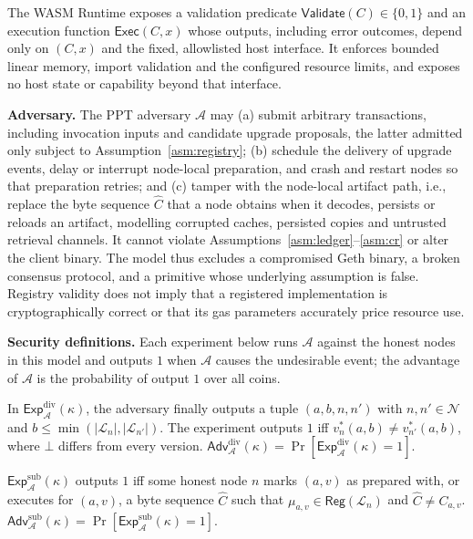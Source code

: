 \documentclass[runningheads]{llncs}
\begin{document}
\begin{assumption}
\label{asm:runtime}
The WASM Runtime exposes a validation predicate $\mathsf{Validate}(C)\in\{0,1\}$ and an execution function $\mathsf{Exec}(C,x)$ whose outputs, including error outcomes, depend only on $(C,x)$ and the fixed, allowlisted host interface. It enforces bounded linear memory, import validation and the configured resource limits, and exposes no host state or capability beyond that interface.
\end{assumption}

\noindent\textbf{Adversary.} The PPT adversary $\mathcal{A}$ may (a) submit arbitrary transactions, including invocation inputs and candidate upgrade proposals, the latter admitted only subject to Assumption~\ref{asm:registry}; (b) schedule the delivery of upgrade events, delay or interrupt node-local preparation, and crash and restart nodes so that preparation retries; and (c) tamper with the node-local artifact path, i.e., replace the byte sequence $\widehat{C}$ that a node obtains when it decodes, persists or reloads an artifact, modelling corrupted caches, persisted copies and untrusted retrieval channels. It cannot violate Assumptions~\ref{asm:ledger}--\ref{asm:cr} or alter the client binary. The model thus excludes a compromised Geth binary, a broken consensus protocol, and a primitive whose underlying assumption is false. Registry validity does not imply that a registered implementation is cryptographically correct or that its gas parameters accurately price resource use.

\smallskip
\noindent\textbf{Security definitions.} Each experiment below runs $\mathcal{A}$ against the honest nodes in this model and outputs $1$ when $\mathcal{A}$ causes the undesirable event; the advantage of $\mathcal{A}$ is the probability of output $1$ over all coins.

\begin{definition}
\label{def:div}
In $\mathsf{Exp}^{\mathrm{div}}_{\mathcal{A}}(\kappa)$, the adversary finally outputs a tuple $(a,b,n,n')$ with $n,n'\in\mathcal{N}$ and $b\le\min(|\mathcal{L}_n|,|\mathcal{L}_{n'}|)$. The experiment outputs $1$ iff $v^{*}_{n}(a,b)\neq v^{*}_{n'}(a,b)$, where $\bot$ differs from every version. $\mathsf{Adv}^{\mathrm{div}}_{\mathcal{A}}(\kappa)=\Pr[\mathsf{Exp}^{\mathrm{div}}_{\mathcal{A}}(\kappa)=1]$.
\end{definition}

\begin{definition}
\label{def:sub}
$\mathsf{Exp}^{\mathrm{sub}}_{\mathcal{A}}(\kappa)$ outputs $1$ iff some honest node $n$ marks $(a,v)$ as prepared with, or executes for $(a,v)$, a byte sequence $\widehat{C}$ such that $\mu_{a,v}\in\mathsf{Reg}(\mathcal{L}_n)$ and $\widehat{C}\neq C_{a,v}$. $\mathsf{Adv}^{\mathrm{sub}}_{\mathcal{A}}(\kappa)=\Pr[\mathsf{Exp}^{\mathrm{sub}}_{\mathcal{A}}(\kappa)=1]$.
\end{definition}
\end{document}

